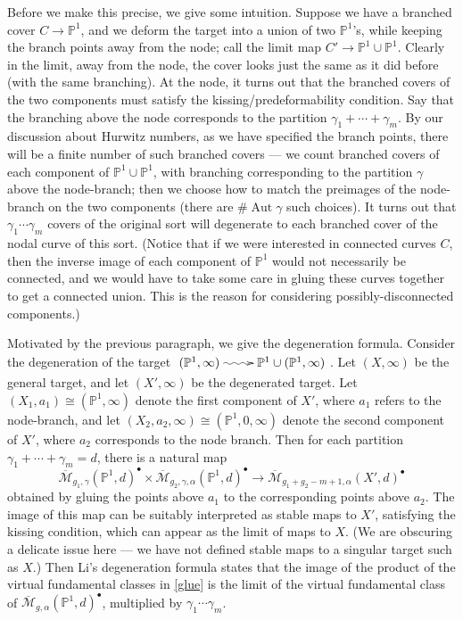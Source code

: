 \documentclass[12pt,letterpaper]{amsart}
\newcommand{\proj}{\mathbb P}
\newcommand{\cm}{{\mathcal{M}}}
\newcommand{\cmbar}{\overline{\cm}}
\newcommand{\al}{\alpha}
\newcommand{\ga}{\gamma}
\newcommand{\Aut}{\operatorname{Aut}}
\newcommand{\dis}{\bullet}
\newcommand{\lremind}[1]{{\bf[label:  #1]}}
\renewcommand{\lremind}[1]{{}}
\begin{document}
{Before we make this precise, we give some intuition.  Suppose we have
a branched cover $C \rightarrow \proj^1$, and we deform the target
into a union of two $\proj^1$'s, while keeping the branch points away
from the node; call the limit map $C' \rightarrow \proj^1 \cup
\proj^1$.  Clearly in the limit, away from the node, the cover looks
just the same as it did before (with the same branching).  At the
node, it turns out that the branched covers of the two components must
satisfy the kissing/predeformability condition. Say that the
branching above the node corresponds to the partition $\ga_1 + \cdots +
\ga_m$.  By our discussion about Hurwitz numbers, as we have specified
the branch points, there will be a finite number of such branched
covers --- we count branched covers of each component of $\proj^1 \cup
\proj^1$, with branching corresponding to the partition $\ga$ above
the node-branch; then we choose how to match the preimages of the
node-branch on the two components (there are $\# \Aut \ga$ such
choices).  It turns out that $\ga_1 \cdots \ga_m$ covers of the
original sort will degenerate to each branched cover of the nodal
curve of this sort.  (Notice that if we were interested in connected
curves $C$, then the inverse image of each component of $\proj^1$
would not necessarily be connected, and we would have to take some
care in gluing these curves together to get a connected union.  This
is the reason for considering possibly-disconnected components.)

Motivated by the previous paragraph, we give the degeneration formula.
Consider the degeneration of the target $\xymatrix{(\proj^1, \infty)
  \ar@{~>}[r] & \proj^1 \cup (\proj^1 , \infty)}$.  Let $(X, \infty)$ be
the general target, and let $(X', \infty)$ be the degenerated
target. Let $(X_1, a_1) \cong (\proj^1, \infty)$ denote the first
component of $X'$, where $a_1$ refers to the node-branch, and let
$(X_2, a_2, \infty) \cong (\proj^1, 0, \infty)$ denote the second
component of $X'$, where $a_2$ corresponds to the node branch.  Then
for each partition $\ga_1 + \cdots + \ga_m = d$, there is a
natural map\lremind{glue}
\begin{equation}\label{glue}
\cmbar_{g_1, \ga}(\proj^1, d)^{\dis}
\times \cmbar_{g_2, \ga, \al}(\proj^1, d)^{\dis} \rightarrow
\cmbar_{g_1+g_2 - m+1, \al}(X', d)^{\dis}
\end{equation}
obtained by gluing the points above $a_1$ to the corresponding points
above $a_2$. The image of this map can be suitably interpreted as
stable maps to $X'$, satisfying the kissing condition, which can
appear as the limit of maps to $X$.  
(We are obscuring a delicate issue here --- we have not
defined stable maps to a singular target such as $X$.)
Then Li's degeneration formula
states that the image of the product of the virtual fundamental
classes in \eqref{glue} is the limit of the virtual fundamental class
of $\cmbar_{g,\al}(\proj^1,d)^{\dis}$, multiplied by $\ga_1 \cdots
\ga_m$.

}
\end{document}
